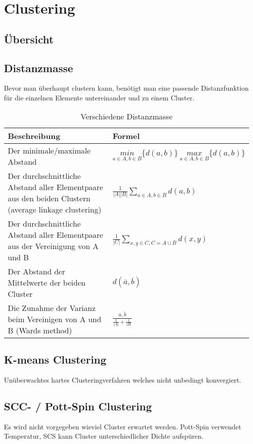 \section{Clustering}
\subsection{Übersicht}

\subsection{Distanzmasse}
Bevor man überhaupt clustern kann, benötigt man eine passende Distanzfunktion für die einzelnen Elemente untereinander und zu einem Cluster.
\begin{table}[htbp]
	\begin{tabular}{p{8cm} | p{8cm}}
		Beschreibung & Formel \\
		\hline
		{Der minimale/maximale Abstand} & {
			$\underset{a \in A, b \in B}{min}\{d(a,b)\} ~ \underset{a \in A, b \in B}{max}\{d(a,b)\}$
		}
		\\
		{Der durchschnittliche Abstand aller Elementpaare aus den beiden Clustern (average linkage clustering)} & {
			$\frac{1}{|A||B|} \sum\limits_{a \in A, b \in B}{d(a,b)}$
		}
		\\
		{Der durchschnittliche Abstand aller Elementpaare aus der Vereinigung von A und B} & {
			$\frac{1}{|C|} \sum\limits_{x,y \in C, C=A \cup B}{d(x,y)}$
		}
		\\
		{Der Abstand der Mittelwerte der beiden Cluster} & {
			$d(\overline a, \overline b)$
		}
		\\
		{Die Zunahme der Varianz beim Vereinigen von A und B (Wards method)} & {
			$\frac{\overline a, \overline b}{\frac{1}{|A|} + \frac{1}{|B|}}$
		}
	\end{tabular}
	\caption{Verschiedene Distanzmasse}
	\label{tab:distanzmasse}
\end{table}
\subsection{K-means Clustering}
Unüberwachtes hartes Clusteringverfahren welches nicht unbedingt konvergiert.
\subsection{SCC- / Pott-Spin Clustering}
Es wird nicht vorgegeben wieviel Cluster erwartet werden. Pott-Spin verwendet Temperatur, SCS kann Cluster unterschiedlicher Dichte aufspüren.

